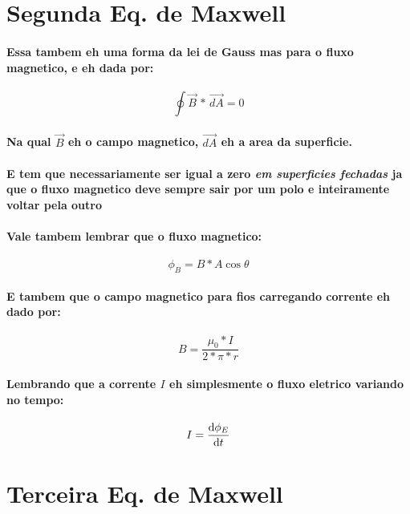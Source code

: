 \documentclass[12pt,twoside, a4paper, twocolumn]{article}
\begin{document}
\section{Segunda Eq. de Maxwell}
\paragraph*{Essa tambem eh uma forma da lei de Gauss mas para o fluxo magnetico, e eh dada por:}
\begin{equation}
    \oint  \vec{B} \, * \, \vec{dA} = 0
\end{equation}
\paragraph*{Na qual $\vec{B}$ eh o campo magnetico, $\vec{dA}$ eh a area da superficie.}
\paragraph*{E tem que necessariamente ser igual a zero \emph{em superficies fechadas} ja que o fluxo magnetico deve sempre sair por um polo e inteiramente voltar pela outro}

\paragraph*{Vale tambem lembrar que o fluxo magnetico:}
\begin{equation}
    \phi_B = B  *  A \cos{\theta}
\end{equation}
\paragraph*{E tambem que o campo magnetico para fios carregando corrente eh dado por:}
\begin{equation}
    B = \frac{\mu_0 * I}{2 * \pi * r}
\end{equation}
\paragraph*{Lembrando que a corrente $I$ eh simplesmente o fluxo eletrico variando no tempo:}
\begin{equation}
    I = \frac{\mathrm d \phi_E}{\mathrm d t}
\end{equation}


\section{Terceira Eq. de Maxwell}
\end{document}
